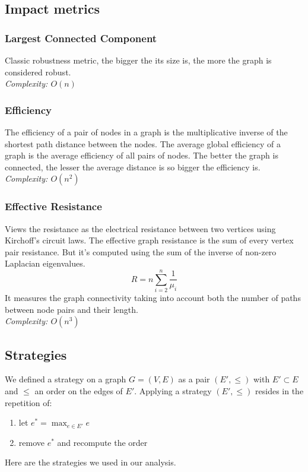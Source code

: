 \documentclass{article}
\begin{document}
\subsection{Impact metrics}
\subsubsection{Largest Connected Component}
Classic robustness metric, the bigger the its size is, the more the graph is considered robust.\\
\textit{Complexity: $O(n)$}

\subsubsection{Efficiency}
The efficiency of a pair of nodes in a graph is the multiplicative inverse of the shortest path distance between the nodes. The average global efficiency of a graph is the average efficiency of all pairs of nodes. The better the graph is connected, the lesser the average distance is so bigger the efficiency is.\\
\textit{Complexity: $O(n^2)$}

\subsubsection{Effective Resistance}
Views the resistance as the electrical resistance between two vertices using Kirchoff's circuit laws. The effective graph resistance is the sum of every vertex pair resistance. But it's computed using the sum of the inverse of non-zero Laplacian eigenvalues.
$$R = n \sum_{i=2}^n\frac{1}{\mu_i}$$
It measures the graph connectivity taking into account both the number of paths between node pairs and their length.\\
\textit{Complexity: $O(n^3)$}


\subsection{Strategies}
    We defined a strategy on a graph $G = (V, E)$ as a pair $(E', \leq)$ with $E'\subset E$ and $\leq$ an order on the edges of $E'$. Applying a strategy $(E', \leq)$ resides in the repetition of:
    \begin{enumerate}
        \item let $e^* = \max_{e\in E'}{e}$
        \item remove $e^*$ and recompute the order
    \end{enumerate}Here are the strategies we used in our analysis.
\end{document}
